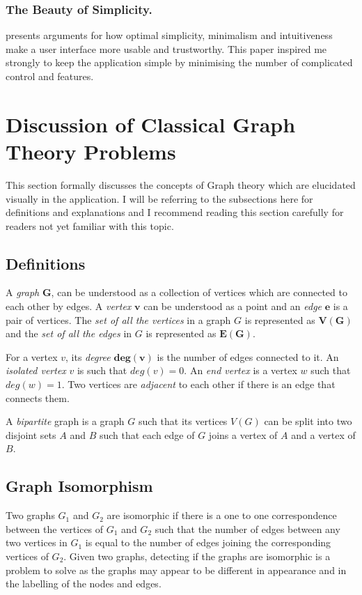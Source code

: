 \subsubsection{The Beauty of Simplicity.}
\cite{Karvonen2000} presents arguments for how optimal simplicity, minimalism and
intuitiveness make a user interface more usable and trustworthy. This paper inspired me strongly to keep the application simple by minimising the number of complicated
control and features.

\section{Discussion of Classical Graph Theory Problems}
This section formally discusses the concepts of Graph theory which are
elucidated visually in the application.  I will be referring to the subsections here for definitions and explanations and I recommend reading this section carefully for readers not yet familiar with this topic.

\subsection{Definitions}
\label{graphtheory: definitions}
A \emph{graph} $\boldsymbol{G}$, can be understood as a collection of vertices which are
connected to each other by edges.  A \emph{vertex} $\boldsymbol{v}$ can be understood as a
point and an \emph{edge} $\boldsymbol{e}$ is a pair of vertices.  The \emph{set of all the vertices}
in a graph $G$ is represented as $\boldsymbol{V(G)}$ and the \emph{set of all the
edges} in $G$ is represented as $\boldsymbol{E(G)}$.

For a vertex $v$, its \emph{degree} $\boldsymbol{deg(v)}$ is the number of edges
connected to it.  An \emph{isolated vertex} $v$ is such that $deg(v) = 0$. An
\emph{end vertex} is a vertex $w$ such that $deg(w) = 1$.  Two vertices are
\emph{adjacent} to each other if there is an edge that connects them.

A \emph{bipartite} graph is a graph $G$ such that its vertices $V(G)$ can
be split into two disjoint sets $A$ and $B$ such that each edge of $G$ joins a
vertex of $A$ and a vertex of $B$. \cite{Newman10} 


\subsection{Graph Isomorphism}
Two graphs $G_1$ and $G_2$ are isomorphic if there is a one to one correspondence
between the vertices of $G_1$ and $G_2$ such that the number of edges between any
two vertices in $G_1$ is equal to the number of edges joining the corresponding
vertices of $G_2$.  Given two graphs, detecting if the graphs are isomorphic is
a problem to solve as the graphs may appear to be different in appearance and
in the labelling of the nodes and edges. \cite{Newman10}

